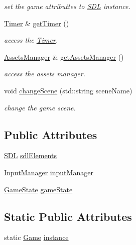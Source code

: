 \begin{DoxyCompactItemize}
\begin{DoxyCompactList}\small\item\em set the game attributtes to \hyperlink{classengine_1_1_s_d_l}{S\+DL} instance. \end{DoxyCompactList}\item 
\hyperlink{classengine_1_1_timer}{Timer} \& \hyperlink{classengine_1_1_game_af3b784dd57665c8b8cfa8d17e70fff9a}{get\+Timer} ()
\begin{DoxyCompactList}\small\item\em access the \hyperlink{classengine_1_1_timer}{Timer}. \end{DoxyCompactList}\item 
\hyperlink{classengine_1_1_assets_manager}{Assets\+Manager} \& \hyperlink{classengine_1_1_game_ae47c2387cf5bd6881161ae6f556fe385}{get\+Assets\+Manager} ()
\begin{DoxyCompactList}\small\item\em access the assets manager. \end{DoxyCompactList}\item 
void \hyperlink{classengine_1_1_game_a7150904ff2536b8553b4a152a724c67c}{change\+Scene} (std\+::string scene\+Name)
\begin{DoxyCompactList}\small\item\em change the game scene. \end{DoxyCompactList}\end{DoxyCompactItemize}
\subsection*{Public Attributes}
\begin{DoxyCompactItemize}
\item 
\hyperlink{classengine_1_1_s_d_l}{S\+DL} \hyperlink{classengine_1_1_game_ab4a295f7b30b191183d5411f5fa5d66b}{sdl\+Elements}
\item 
\hyperlink{classengine_1_1_input_manager}{Input\+Manager} \hyperlink{classengine_1_1_game_ab9e84515e30301e673fa693c676f0c63}{input\+Manager}
\item 
\hyperlink{namespaceengine_af41e517ae74e4a8447ff80a2abcaf8dd}{Game\+State} \hyperlink{classengine_1_1_game_a6e5b7bd8569cf22309b9f934ba426eae}{game\+State}
\end{DoxyCompactItemize}
\subsection*{Static Public Attributes}
\begin{DoxyCompactItemize}
\item 
static \hyperlink{classengine_1_1_game}{Game} \hyperlink{classengine_1_1_game_aed34cffcaed0e8027c11d68b1d42258b}{instance}
\end{DoxyCompactItemize}


